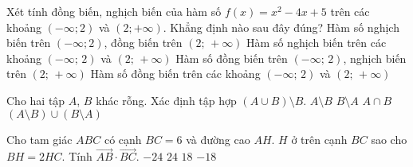 \begin{ex}%
Xét tính đồng biến, nghịch biến của hàm số $f\left(x\right)=x^2-4x+5$ trên các khoảng $\left(-\infty;2\right)$ và $\left(2;+\infty\right)$. Khẳng định nào sau đây đúng?
\choice
{\True Hàm số nghịch biến trên $\left(-\infty;2\right)$, đồng biến trên $\left(2;\,+\infty\right)$}
{Hàm số nghịch biến trên các khoảng $\left(-\infty;\,2\right)$ và $\left(2;\,+\infty\right)$}
{Hàm số đồng biến trên $\left(-\infty;\,2\right)$, nghịch biến trên $\left(2;\,+\infty\right)$}
{Hàm số đồng biến trên các khoảng $\left(-\infty ;\,2\right)$ và $\left(2;\,+\infty\right)$}
\end{ex}

\begin{ex}%
Cho hai tập $A$, $B$ khác rỗng. Xác định tập hợp $\left(A\cup B\right)\setminus B$.
\choice
{\True $A\setminus B$}
{$B\setminus A$}
{$ A\cap B$}
{$\left(A\setminus B\right)\cup\left(B\setminus A\right)$}
\end{ex}

\begin{ex}%
 	Cho tam giác $ABC$ có cạnh $BC=6$ và đường cao $AH$. $H$ ở trên cạnh $BC$ sao cho $BH=2HC$. Tính $\overrightarrow{AB}\cdot \overrightarrow{BC}$.
 	\choice
 	{\True $-24$}
 	{$24$}
 	{$18$}
 	{$-18$}
 \end{ex}

